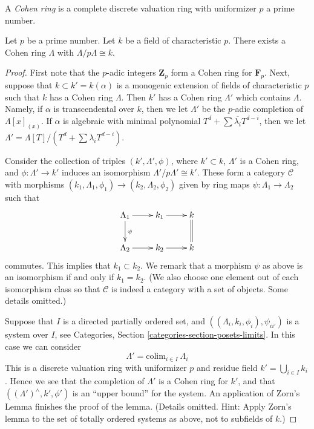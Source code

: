 \begin{definition}
\label{definition-cohen-ring}
A {\it Cohen ring} is a complete discrete valuation ring with
uniformizer $p$ a prime number.
\end{definition}

\begin{lemma}
\label{lemma-cohen-rings-exist}
Let $p$ be a prime number.
Let $k$ be a field of characteristic $p$.
There exists a Cohen ring $\Lambda$ with $\Lambda/p\Lambda \cong k$.
\end{lemma}

\begin{proof}
First note that the $p$-adic integers $\mathbf{Z}_p$ form a Cohen ring
for $\mathbf{F}_p$. Next, suppose that $k \subset k' = k(\alpha)$ is a monogenic
extension of fields of characteristic $p$ such that $k$ has a Cohen
ring $\Lambda$. Then $k'$ has a Cohen ring $\Lambda'$ which contains
$\Lambda$. Namely, if $\alpha$ is transcendental over $k$, then we let
$\Lambda'$ be the $p$-adic completion of $\Lambda[x]_{(x)}$. If $\alpha$
is algebraic with minimal polynomial
$T^d + \sum \overline{\lambda_i}T^{d - i}$, then we let
$\Lambda' = \Lambda[T]/(T^d + \sum \lambda_iT^{d - i})$.

\medskip\noindent
Consider the collection of triples $(k', \Lambda', \phi)$, where
$k' \subset k$, $\Lambda'$ is a Cohen ring, and
$\phi : \Lambda' \to k'$ induces an isomorphism $\Lambda'/p\Lambda' \cong k'$.
These form a category $\mathcal{C}$ with morphisms
$(k_1, \Lambda_1, \phi_1) \to (k_2, \Lambda_2, \phi_2)$
given by ring maps $\psi : \Lambda_1 \to \Lambda_2$ such that
$$
\xymatrix{
\Lambda_1 \ar[d]^\psi \ar[r] & k_1 \ar[r] & k \ar@{=}[d] \\
\Lambda_2 \ar[r] & k_2 \ar[r] & k
}
$$
commutes. This implies that $k_1 \subset k_2$. We remark that
a morphism $\psi$ as above is an isomorphism if and only if $k_1 = k_2$.
(We also choose one element out of each isomorphism class
so that $\mathcal{C}$ is indeed a category with a set of objects. Some
details omitted.)

\medskip\noindent
Suppose that $I$ is a directed partially ordered set, and
$((\Lambda_i, k_i, \phi_i), \psi_{ii'})$ is a system over $I$, see
Categories, Section \ref{categories-section-posets-limits}.
In this case we can consider
$$
\Lambda' = \text{colim}_{i \in I}\ \Lambda_i
$$
This is a discrete valuation ring with uniformizer $p$ and
residue field $k' = \bigcup_{i \in I} k_i$. Hence we see that
the completion of $\Lambda'$ is a Cohen ring for $k'$, and
that $((\Lambda')^\wedge, k', \phi')$ is an ``upper bound'' for the
system. An application of Zorn's Lemma finishes the proof of the
lemma. (Details omitted. Hint: Apply Zorn's lemma to the set of
totally ordered systems as above, not to subfields of $k$.)
\end{proof}

